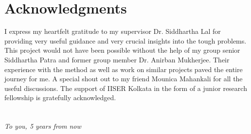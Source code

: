 \chapter*{Acknowledgments}
I express my heartfelt gratitude to my supervisor Dr. Siddhartha Lal for providing very useful guidance and very crucial insights into the tough problems. This project would not have been possible without the help of my group senior Siddhartha Patra and former group member Dr. Anirban Mukherjee. Their experience with the method as well as work on similar projects paved the entire journey for me. A special shout out to my friend Mounica Mahankali for all the useful discussions. The support of IISER Kolkata in the form of a junior research fellowship is gratefully acknowledged.

\chapter*{}
\begin{center}
	\vspace*{100pt}
	\Large{\textit{To you, 5 years from now}}
\end{center}

